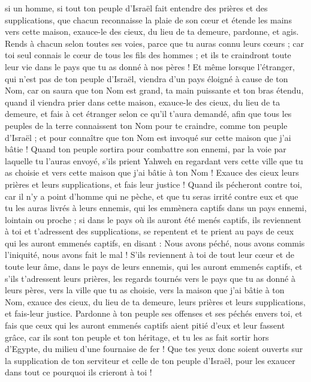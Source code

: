 \begin{multicols}{2}
si un homme, si tout ton peuple d'Israël fait entendre des prières et des supplications, que chacun reconnaisse la plaie de son cœur et étende les mains vers cette maison,
exauce-le des cieux, du lieu de ta demeure, pardonne, et agis. Rends à chacun selon toutes ses voies, parce que tu auras connu leurs cœurs ; car toi seul connais le cœur de tous les fils des hommes ;
et ils te craindront toute leur vie dans le pays que tu as donné à nos pères !
Et même lorsque l'étranger, qui n’est pas de ton peuple d'Israël, viendra d'un pays éloigné à cause de ton Nom,
car on saura que ton Nom est grand, ta main puissante et ton bras étendu, quand il viendra prier dans cette maison,
exauce-le des cieux, du lieu de ta demeure, et fais à cet étranger selon ce qu’il t’aura demandé, afin que tous les peuples de la terre connaissent ton Nom pour te craindre, comme ton peuple d'Israël ; et pour connaître que ton Nom est invoqué sur cette maison que j'ai bâtie !
Quand ton peuple sortira pour combattre son ennemi, par la voie par laquelle tu l’auras envoyé, s'ils prient Yahweh en regardant vers cette ville que tu as choisie et vers cette maison que j'ai bâtie à ton Nom !
Exauce des cieux leurs prières et leurs supplications, et fais leur justice !
Quand ils pécheront contre toi, car il n'y a point d'homme qui ne pèche, et que tu seras irrité contre eux et que tu les auras livrés à leurs ennemis, qui les emmènera captifs dans un pays ennemi, lointain ou proche ;
si dans le pays où ils auront été menés captifs, ils reviennent à toi et t’adressent des supplications, se repentent et te prient au pays de ceux qui les auront emmenés captifs, en disant : Nous avons péché, nous avons commis l’iniquité, nous avons fait le mal !
S'ils reviennent à toi de tout leur cœur et de toute leur âme, dans le pays de leurs ennemis, qui les auront emmenés captifs, et s'ils t'adressent leurs prières, les regards tournés vers le pays que tu as donné à leurs pères, vers la ville que tu as choisie, vers la maison que j'ai bâtie à ton Nom,
exauce des cieux, du lieu de ta demeure, leurs prières et leurs supplications, et fais-leur justice.
Pardonne à ton peuple ses offenses et ses péchés envers toi, et fais que ceux qui les auront emmenés captifs aient pitié d'eux et leur fassent grâce,
car ils sont ton peuple et ton héritage, et tu les as fait sortir hors d'Egypte, du milieu d'une fournaise de fer !
Que tes yeux donc soient ouverts sur la supplication de ton serviteur et celle de ton peuple d'Israël, pour les exaucer dans tout ce pourquoi ils crieront à toi !

\end{multicols}
